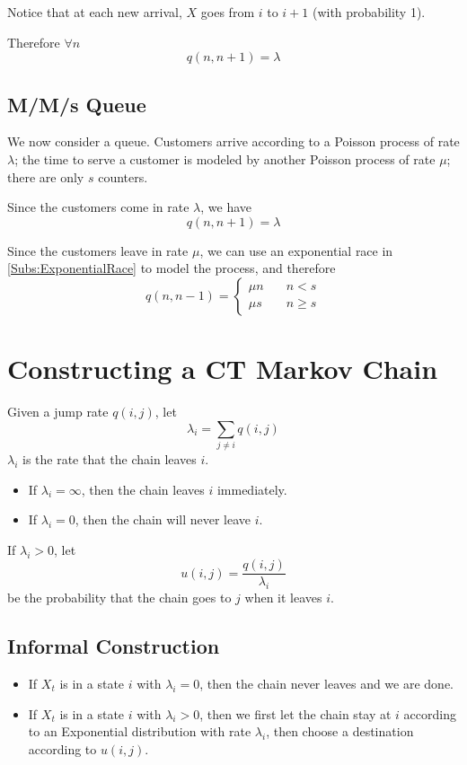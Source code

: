         Notice that at each new arrival, $X$ goes from $i$ to $i+1$ (with probability 1).
        
        Therefore $\forall n$
        \[ q(n, n+1) = \lambda \]

    \subsection{M/M/s Queue}
        We now consider a queue. Customers arrive according to a Poisson process of rate $\lambda$; the time to serve a customer is modeled by another Poisson process of rate $\mu$; there are only $s$ counters.

        Since the customers come in rate $\lambda$, we have
        \[ q(n, n+1) = \lambda \]

        Since the customers leave in rate $\mu$, we can use an exponential race in \ref{Subs:ExponentialRace} to model the process, and therefore
        \[ q(n, n-1) = \begin{cases}
            \mu n & \quad n < s\\
            \mu s & \quad n \ge s
        \end{cases} \]


\section{Constructing a CT Markov Chain}
    Given a jump rate $q(i,j)$, let
    \[ \lambda_i = \sum_{j \neq i}q(i,j) \]
    $\lambda_i$ is the rate that the chain leaves $i$.
    \begin{itemize}
        \item If $\lambda_i = \infty$, then the chain leaves $i$ immediately.
        \item If $\lambda_i = 0$, then the chain will never leave $i$.
    \end{itemize}
    If $\lambda_i > 0$, let
    \[ u(i,j) = \frac{q(i,j)}{\lambda_i} \]
    be the probability that the chain goes to $j$ when it leaves $i$.

    \subsection{Informal Construction}
        \begin{itemize}
            \item If $X_t$ is in a state $i$ with $\lambda_i=0$, then the chain never leaves and we are done.
            \item If $X_t$ is in a state $i$ with $\lambda_i > 0$, then we first let the chain stay at $i$ according to an Exponential distribution with rate $\lambda_i$, then choose a destination according to $u(i,j)$.
        \end{itemize}


